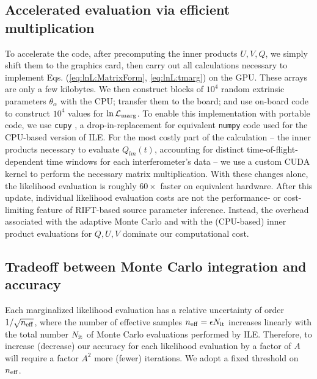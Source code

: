 \documentclass[twocolumn,prd,nofootinbib]{revtex4}
\newcommand\AddedResponse[1]{{\color{blue} {#1}}}
\newcommand\lnLmarg{ \ln{\cal L}_{\rm marg}{}}
\newcommand\unit[1]{{\rm #1}}
\newcommand\ILE{ILE}
\begin{document}
\subsection{Accelerated evaluation via efficient multiplication}


  To accelerate the code, after precomputing the inner products $U,V,Q$, we simply shift them to the
graphics card, then carry out all calculations necessary to implement Eqs. (\ref{eq:lnL:MatrixForm}, \ref{eq:lnL:tmarg})
on the GPU.  
\AddedResponse{These arrays are only a few kilobytes.  We then construct blocks of $10^4$ random extrinsic parameters $\theta_\alpha$
  with the CPU; transfer them to the board; and use on-board code to construct $10^4$ values for $\lnLmarg$. }
To enable this implementation with portable code, we use \texttt{cupy} \cite{cupy_learningsys2017}, a drop-in-replacement for equivalent
\texttt{numpy} code used for the CPU-based version of ILE.    For the most costly part of the calculation -- the inner
products necessary to evaluate $Q_{lm}(t)$, accounting for distinct time-of-flight-dependent time windows for each
interferometer's data -- we use a custom CUDA kernel to perform the necessary matrix multiplication.  
%
With these changes alone, the likelihood evaluation is roughly $60\times$ faster on equivalent hardware.  
After this update, individual likelihood evaluation costs are not the performance- or cost-limiting feature of RIFT-based source
parameter inference.  Instead, the overhead associated with the adaptive Monte Carlo and with the (CPU-based) inner
product evaluations for $Q,U,V$ dominate our computational cost.



\subsection{Tradeoff between Monte Carlo integration and accuracy}

Each marginalized likelihood evaluation has a relative uncertainty of order  $1/\sqrt{n_{\rm eff}}$, where the number of
effective samples $n_{\rm eff}=\epsilon N_{\rm it}$ increases linearly with the total number $N_{\rm it}$ of Monte Carlo
evaluations performed by \ILE{}.  Therefore, to increase (decrease) our accuracy for each likelihood evaluation by a factor of $A$
will require a factor $A^2$ more (fewer) iterations.   
%
We adopt a fixed threshold on $n_{\rm eff}$.  
\end{document}
